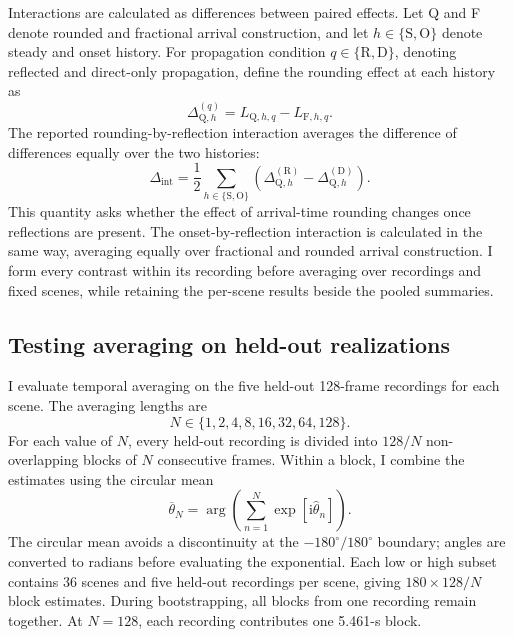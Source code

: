 \documentclass{edpsci}
\begin{document}
Interactions are calculated as differences between paired effects. Let Q and F denote rounded and fractional arrival construction, and let $h\in\{\mathrm{S},\mathrm{O}\}$ denote steady and onset history. For propagation condition $q\in\{\mathrm{R},\mathrm{D}\}$, denoting reflected and direct-only propagation, define the rounding effect at each history as
\begin{equation}
	\Delta_{\mathrm{Q},h}^{(q)}
	=
	L_{\mathrm{Q},h,q}-L_{\mathrm{F},h,q}.
\end{equation}
The reported rounding-by-reflection interaction averages the difference of differences equally over the two histories:
\begin{equation}
	\Delta_{\mathrm{int}}
	=
	\frac{1}{2}\sum_{h\in\{\mathrm{S},\mathrm{O}\}}
	\left(\Delta_{\mathrm{Q},h}^{(\mathrm{R})}
	-\Delta_{\mathrm{Q},h}^{(\mathrm{D})}\right).
\end{equation}
This quantity asks whether the effect of arrival-time rounding changes once reflections are present. The onset-by-reflection interaction is calculated in the same way, averaging equally over fractional and rounded arrival construction. I form every contrast within its recording before averaging over recordings and fixed scenes, while retaining the per-scene results beside the pooled summaries.

\subsection{Testing averaging on held-out realizations}
\label{sec:averaging}

I evaluate temporal averaging on the five held-out 128-frame recordings for each scene. The averaging lengths are
\begin{equation}
	N\in\{1,2,4,8,16,32,64,128\}.
\end{equation}
For each value of $N$, every held-out recording is divided into $128/N$ non-overlapping blocks of $N$ consecutive frames. Within a block, I combine the estimates using the circular mean
\begin{equation}
	\overline{\theta}_N
	=
	\arg\!\left(
	\sum_{n=1}^{N}
	\exp\!\left[\mathrm{i}\widehat{\theta}_n\right]
	\right).
\end{equation}
The circular mean avoids a discontinuity at the $-180^\circ/180^\circ$ boundary; angles are converted to radians before evaluating the exponential. Each low or high subset contains 36 scenes and five held-out recordings per scene, giving $180\times128/N$ block estimates. During bootstrapping, all blocks from one recording remain together. At $N=128$, each recording contributes one 5.461-s block.
\end{document}
